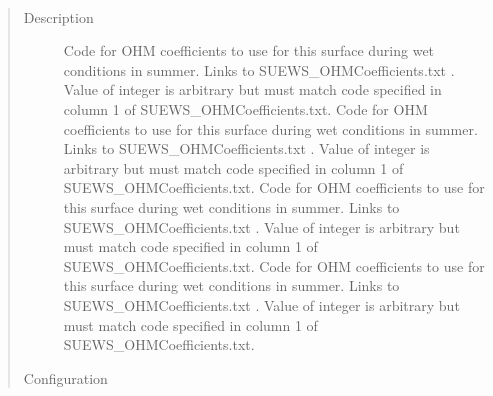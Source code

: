 \documentclass[letterpaper,10pt,english]{sphinxmanual}
\begin{document}

\begin{fulllineitems}
\label{\detokenize{input_files/SUEWS_SiteInfo/Input_Options:cmdoption-arg-ohmcode-summerwet}}~\begin{quote}\begin{description}
\item[{Description}] \leavevmode
Code for OHM coefficients to use for this surface during wet conditions in summer. Links to SUEWS\_OHMCoefficients.txt . Value of integer is arbitrary but must match code specified in column 1 of SUEWS\_OHMCoefficients.txt.  Code for OHM coefficients to use for this surface during wet conditions in summer. Links to SUEWS\_OHMCoefficients.txt . Value of integer is arbitrary but must match code specified in column 1 of SUEWS\_OHMCoefficients.txt.  Code for OHM coefficients to use for this surface during wet conditions in summer. Links to SUEWS\_OHMCoefficients.txt . Value of integer is arbitrary but must match code specified in column 1 of SUEWS\_OHMCoefficients.txt.  Code for OHM coefficients to use for this surface during wet conditions in summer. Links to SUEWS\_OHMCoefficients.txt . Value of integer is arbitrary but must match code specified in column 1 of SUEWS\_OHMCoefficients.txt.

\item[{Configuration}] \leavevmode


\end{description}
\end{quote}
\end{fulllineitems}
\end{document}
